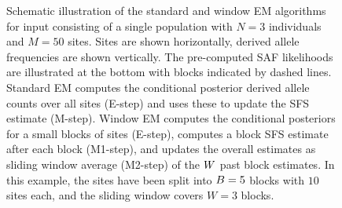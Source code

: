 \begin{figure}
    \begin{center}
    \end{center}
    \caption{
        Schematic illustration of the standard and window EM algorithms for input consisting of a single population with $N = 3$ individuals and $M = 50$ sites.
        Sites are shown horizontally, derived allele frequencies are shown vertically.
        The pre-computed SAF likelihoods are illustrated at the bottom with blocks indicated by dashed lines.
        Standard EM computes the conditional posterior derived allele counts over all sites (E-step) and uses these to update the SFS estimate (M-step).
        Window EM computes the conditional posteriors for a small blocks of sites (E-step), computes a block SFS estimate after each block (M1-step), and updates the overall estimates as sliding window average (M2-step) of the $W$ past block estimates.
        In this example, the sites have been split into $B = 5$ blocks with $10$ sites each, and the sliding window covers $W = 3$ blocks.
    }
    \label{fig:window}
\end{figure}

